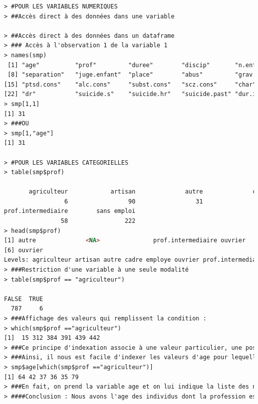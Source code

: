 \begin{lstlisting}[language=html]
     > #POUR LES VARIABLES NUMERIQUES
> ##Accès direct à des données dans une variable

> ##Accès direct à des données dans un dataframe
> ### Accès à l'observation 1 de la variable 1
> names(smp)
 [1] "age"          "prof"         "duree"        "discip"       "n.enfant"     "n.fratrie"    "ecole"       
 [8] "separation"   "juge.enfant"  "place"        "abus"         "grav.cons"    "dep.cons"     "ago.cons"    
[15] "ptsd.cons"    "alc.cons"     "subst.cons"   "scz.cons"     "char"         "rs"           "ed"          
[22] "dr"           "suicide.s"    "suicide.hr"   "suicide.past" "dur.interv"  
> smp[1,1]
[1] 31
> ###OU
> smp[1,"age"]
[1] 31

> #POUR LES VARIABLES CATEGORIELLES
> table(smp$prof)

       agriculteur            artisan              autre              cadre            employe            ouvrier 
                 6                 90                 31                 24                135                227 
prof.intermediaire        sans emploi 
                58                222 
> head(smp$prof)
[1] autre              <NA>               prof.intermediaire ouvrier            sans emploi       
[6] ouvrier           
Levels: agriculteur artisan autre cadre employe ouvrier prof.intermediaire sans emploi
> ###Restriction d'une variable à une seule modalité
> table(smp$prof == "agriculteur")

FALSE  TRUE 
  787     6 
> ###Affichage des valeurs qui remplissent la condition :
> which(smp$prof =="agriculteur")
[1]  15 312 384 391 439 442
> ###Ce principe d'indexation associe à une valeur particulier, une position donnée.
> ###Ainsi, il nous est facile d'indexer les valeurs d'age pour lequelles la profession du détenu est agriculteur
> smp$age[which(smp$prof =="agriculteur")]
[1] 64 42 37 36 35 79
> ###En fait, on prend la variable age et on lui indique la liste des numéros d'obervations qui nous intéressent
> ####Conclusion : Nous avons l'age des individus dont la profession est agriculteur.


\end{lstlisting}
